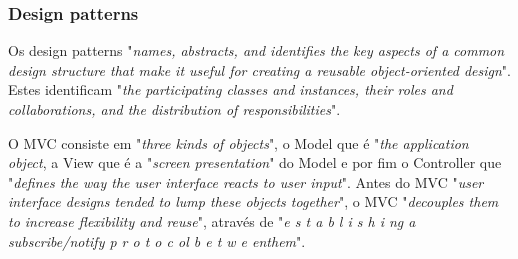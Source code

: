   \subsubsection{Design patterns}
Os design patterns "\emph{names, abstracts, and identifies the key aspects of a common design structure that make it useful for creating a reusable object-oriented design}". Estes identificam "\emph{the participating classes and instances, their roles and collaborations, and the distribution of responsibilities}".

O MVC consiste em "\emph{three kinds of objects}", o Model que é "\emph{the application object}, a View que é a "\emph{screen presentation}" do Model e por fim o Controller que "\emph{defines the way the user interface reacts to user input}". Antes do MVC "\emph{user interface designs tended to lump these objects together}", o MVC "\emph{decouples them to increase flexibility  and reuse}", através de "\emph{e s t a b l i s h i ng     a subscribe/notify p r o t o c ol b e t w e enthem}".
